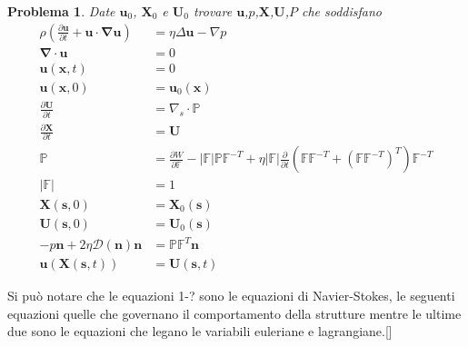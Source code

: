\documentclass{book}
\newtheorem{problem}[theorem]{Problema}
\newcommand{\Nabla}{\boldsymbol{\nabla}}
\begin{document}
\begin{problem}
Date $\mathbf{u}_0$, $\mathbf{X}_0$ e $\mathbf{U}_0$ trovare $\mathbf{u}$,$p$,$\mathbf{X}$,$\mathbf{U}$,$P$ che soddisfano
\begin{equation}
\begin{aligned}
\rho \left ( \frac{\partial \mathbf{u}}{\partial t} + \mathbf{u} \cdot \Nabla \mathbf{u} \right ) &= \eta \Delta \mathbf{u} - \nabla p \\
\Nabla \cdot \mathbf{u} &= 0 \\
\mathbf{u}(\mathbf{x},t)&=0 \\
\mathbf{u}(\mathbf{x},0)&=\mathbf{u}_0(\mathbf{x}) \\
\frac{\partial \mathbf{U}}{\partial t} &= \nabla_s\cdot\mathbb{P}\\
\frac{\partial \mathbf{X}}{\partial t} &= \mathbf{U}\\
\mathbb{P} &= \frac{\partial W}{\partial \mathbb{F}}-|\mathbb{F}|\mathbb{P}\mathbb{F}^{-T}+\eta|\mathbb{F}|\frac{\partial}{\partial t}(\mathbb{F}\mathbb{F}^{-T}+(\mathbb{F}\mathbb{F}^{-T})^{T})\mathbb{F}^{-T}\\
|\mathbb{F}|&=1\\
\mathbf{X}(\mathbf{s},0)&=\mathbf{X}_0(\mathbf{s})\\
\mathbf{U}(\mathbf{s},0)&=\mathbf{U}_0(\mathbf{s})\\
-p\mathbf{n}+2\eta\mathcal{D}(\mathbf{n})\mathbf{n}&=\mathbb{P}\mathbb{F}^T\mathbf{n}\\
\mathbf{u}(\mathbf{X}(\mathbf{s},t))&=\mathbf{U}(\mathbf{s},t)
\end{aligned}
\end{equation}
\end{problem}
Si può notare che le equazioni 1-? sono le equazioni di Navier-Stokes, le seguenti equazioni quelle che governano il comportamento della strutture mentre le ultime due sono le equazioni che legano le variabili euleriane e lagrangiane.[]
\end{document}
